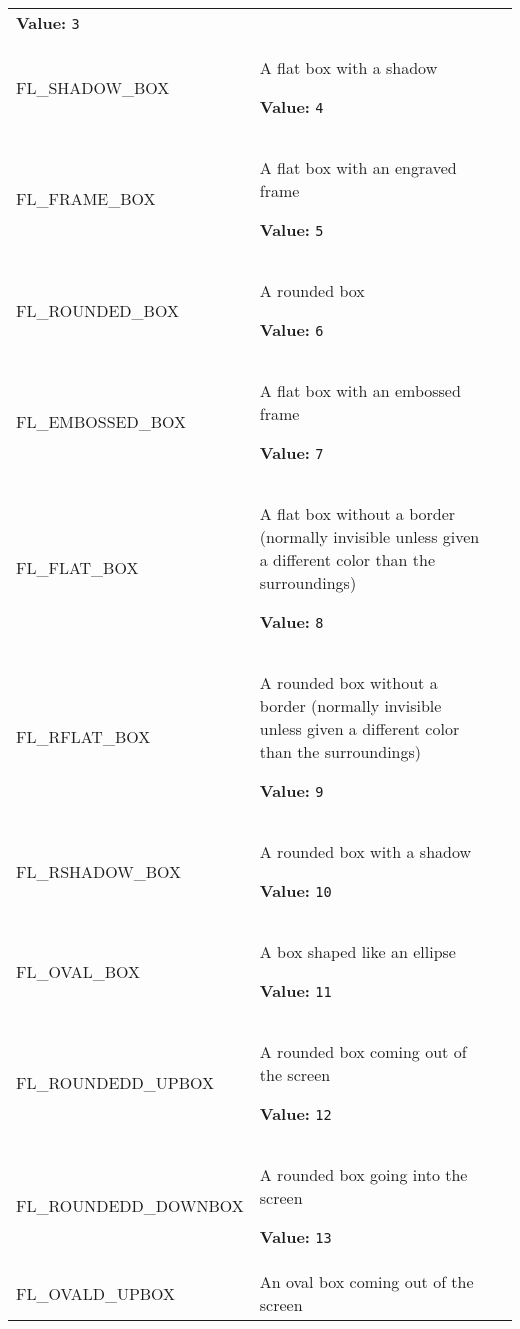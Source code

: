 \begin{longtable}{|p{\varnamewidth}|p{\vardescrwidth}|l}
\textbf{Value:} 
{\tt 3}&\\
\cline{1-2}
\raggedright F\-L\-\_\-S\-H\-A\-D\-O\-W\-\_\-B\-O\-X\- & \raggedright A flat box with a shadow

\textbf{Value:} 
{\tt 4}&\\
\cline{1-2}
\raggedright F\-L\-\_\-F\-R\-A\-M\-E\-\_\-B\-O\-X\- & \raggedright A flat box with an engraved frame

\textbf{Value:} 
{\tt 5}&\\
\cline{1-2}
\raggedright F\-L\-\_\-R\-O\-U\-N\-D\-E\-D\-\_\-B\-O\-X\- & \raggedright A rounded box

\textbf{Value:} 
{\tt 6}&\\
\cline{1-2}
\raggedright F\-L\-\_\-E\-M\-B\-O\-S\-S\-E\-D\-\_\-B\-O\-X\- & \raggedright A flat box with an embossed frame

\textbf{Value:} 
{\tt 7}&\\
\cline{1-2}
\raggedright F\-L\-\_\-F\-L\-A\-T\-\_\-B\-O\-X\- & \raggedright A flat box without a border (normally invisible unless given a
different color than the surroundings)

\textbf{Value:} 
{\tt 8}&\\
\cline{1-2}
\raggedright F\-L\-\_\-R\-F\-L\-A\-T\-\_\-B\-O\-X\- & \raggedright A rounded box without a border (normally invisible unless given a
different color than the surroundings)

\textbf{Value:} 
{\tt 9}&\\
\cline{1-2}
\raggedright F\-L\-\_\-R\-S\-H\-A\-D\-O\-W\-\_\-B\-O\-X\- & \raggedright A rounded box with a shadow

\textbf{Value:} 
{\tt 10}&\\
\cline{1-2}
\raggedright F\-L\-\_\-O\-V\-A\-L\-\_\-B\-O\-X\- & \raggedright A box shaped like an ellipse

\textbf{Value:} 
{\tt 11}&\\
\cline{1-2}
\raggedright F\-L\-\_\-R\-O\-U\-N\-D\-E\-D\-3\-D\-\_\-U\-P\-B\-O\-X\- & \raggedright A rounded box coming out of the screen

\textbf{Value:} 
{\tt 12}&\\
\cline{1-2}
\raggedright F\-L\-\_\-R\-O\-U\-N\-D\-E\-D\-3\-D\-\_\-D\-O\-W\-N\-B\-O\-X\- & \raggedright A rounded box going into the screen

\textbf{Value:} 
{\tt 13}&\\
\cline{1-2}
\raggedright F\-L\-\_\-O\-V\-A\-L\-3\-D\-\_\-U\-P\-B\-O\-X\- & \raggedright An oval box coming out of the screen


\end{longtable}
